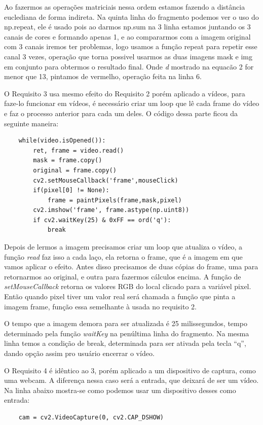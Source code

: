 \documentclass{bmvc2k}
\begin{document}
Ao fazermos as operações matriciais nessa ordem estamos fazendo a distância euclediana
de forma indireta. Na quinta linha do fragmento podemos ver o uso do np.repeat, ele é usado pois
ao darmos np.sum na 3 linha estamos juntando os 3 canais de cores e formando apenas 1, e ao 
compararmos com a imagem original com 3 canais iremos ter problemas, logo usamos a função repeat
para repetir esse canal 3 vezes, operação que torna possivel usarmos as duas imagens
mask e img em conjunto para obtermos o resultado final. Onde {\em d} mostrado na equacão 2 for
menor que 13, pintamos de vermelho, operação feita na linha 6.

\pagebreak

O Requisito 3 usa mesmo efeito do Requisito 2 porém aplicado a vídeos, para faze-lo funcionar
em vídeos, é necessário criar um loop que lê cada frame do vídeo e faz o processo anterior para cada
um deles. O código dessa parte ficou da seguinte maneira:

\begin{verbatim}
    while(video.isOpened()):   
        ret, frame = video.read()
        mask = frame.copy()
        original = frame.copy()
        cv2.setMouseCallback('frame',mouseClick)
        if(pixel[0] != None):
            frame = paintPixels(frame,mask,pixel)
        cv2.imshow('frame', frame.astype(np.uint8))
        if cv2.waitKey(25) & 0xFF == ord('q'):
            break         
\end{verbatim}

Depois de lermos a imagem precisamos criar um loop que atualiza o vídeo, a função 
{\em read} faz isso a cada laço, ela retorna o frame, que é a imagem em que vamos aplicar
o efeito. Antes disso precisamos de duas cópias do frame, uma para retornarmos ao original,
e outra para fazermos cálculos encima. A função de {\em setMouseCallback} retorna os valores RGB
do local clicado para a variável pixel. Então quando pixel tiver um valor real será chamada a função
que pinta a imagem frame, função essa semelhante à usada no requisito 2.

O tempo que a imagem demora para ser atualizada é 25 milissegundos, tempo determinado pela função
{\em waitKey} na penúltima linha do fragmento. Na mesma linha temos a condição de break, determinada
para ser ativada pela tecla ``q'', dando opção assim pro usuário encerrar o vídeo.

O Requisito 4 é idêntico ao 3, porém aplicado a um dispositivo de captura, como uma webcam. A diferença
nessa caso será a entrada, que deixará de ser um vídeo. Na linha abaixo mostra-se como podemos usar um dispositivo
desses como entrada:
\begin{verbatim}
    cam = cv2.VideoCapture(0, cv2.CAP_DSHOW)
\end{verbatim}
\end{document}
